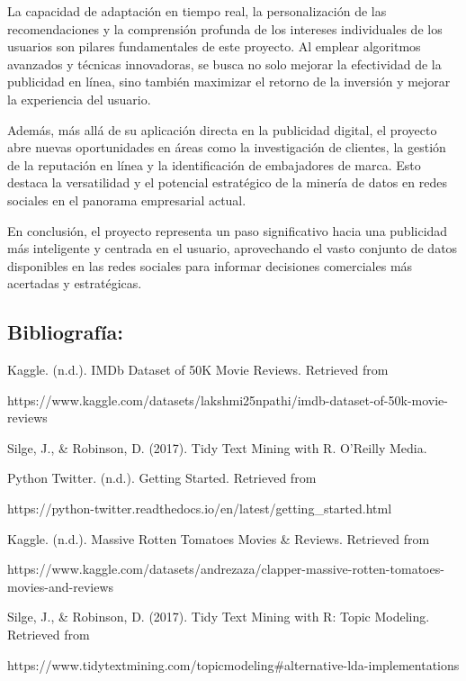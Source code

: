 \documentclass[
  letterpaper,
  DIV=11,
  numbers=noendperiod]{scrartcl}
\begin{document}
La capacidad de adaptación en tiempo real, la personalización de las
recomendaciones y la comprensión profunda de los intereses individuales
de los usuarios son pilares fundamentales de este proyecto. Al emplear
algoritmos avanzados y técnicas innovadoras, se busca no solo mejorar la
efectividad de la publicidad en línea, sino también maximizar el retorno
de la inversión y mejorar la experiencia del usuario.

Además, más allá de su aplicación directa en la publicidad digital, el
proyecto abre nuevas oportunidades en áreas como la investigación de
clientes, la gestión de la reputación en línea y la identificación de
embajadores de marca. Esto destaca la versatilidad y el potencial
estratégico de la minería de datos en redes sociales en el panorama
empresarial actual.

En conclusión, el proyecto representa un paso significativo hacia una
publicidad más inteligente y centrada en el usuario, aprovechando el
vasto conjunto de datos disponibles en las redes sociales para informar
decisiones comerciales más acertadas y estratégicas.

\newpage{}

\subsection{Bibliografía:}\label{bibliografuxeda}

Kaggle. (n.d.). IMDb Dataset of 50K Movie Reviews. Retrieved from

https://www.kaggle.com/datasets/lakshmi25npathi/imdb-dataset-of-50k-movie-reviews

Silge, J., \& Robinson, D. (2017). Tidy Text Mining with R. O'Reilly
Media.

Python Twitter. (n.d.). Getting Started. Retrieved from

https://python-twitter.readthedocs.io/en/latest/getting\_started.html

Kaggle. (n.d.). Massive Rotten Tomatoes Movies \& Reviews. Retrieved
from

https://www.kaggle.com/datasets/andrezaza/clapper-massive-rotten-tomatoes-movies-and-reviews

Silge, J., \& Robinson, D. (2017). Tidy Text Mining with R: Topic
Modeling. Retrieved from

https://www.tidytextmining.com/topicmodeling\#alternative-lda-implementations
\end{document}

